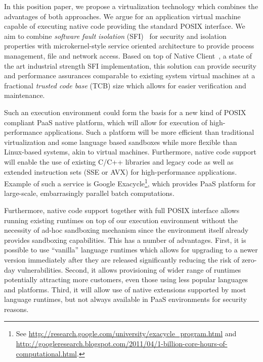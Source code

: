 In this position paper, we propose a virtualization technology which
combines the advantages of both approaches. We argue for an application
virtual machine capable of executing native code providing the standard
POSIX interface. We aim to combine \emph{software fault isolation}
(SFI)~\cite{wahbe:sosp93} for security and isolation properties with
microkernel-style service oriented architecture to provide process
management, file and network access. Based on top of Native
Client~\cite{yee:ieee-sp09}, a state of the art industrial strength SFI
implementation, this solution can provide security and performance
assurances comparable to existing system virtual machines at a
fractional \emph{trusted code base} (TCB) size which allows for easier
verification and maintenance. 

Such an execution environment could form the basis for a new kind of
POSIX compliant PaaS native platform, which will allow for execution of
high-performance applications. Such a platform will be more efficient
than traditional virtualization and some language based sandboxes while
more flexible than Linux-based systems, akin to virtual machines.
Furthermore, native code support will enable the use of existing C/C++
libraries and legacy code as well as extended instruction sets (\eg SSE
or AVX) for high-performance applications. Example of such a service is
Google Exacycle\footnote{See
\url{http://research.google.com/university/exacycle_program.html} and
\url{http://googleresearch.blogspot.com/2011/04/1-billion-core-hours-of-computational.html}.},
which provides PaaS platform for large-scale, embarrasingly parallel
batch computations.

Furthermore, native code support together with full POSIX interface
allows running existing runtimes on top of our execution environment
without the necessity of ad-hoc sandboxing mechanism since the
environment itself already provides sandboxing capabilities. This has a
number of advantages.  First, it is possible to use ``vanilla'' language
runtimes which allows for upgrading to a newer version immediately after
they are released significantly reducing the risk of zero-day
vulnerabilities. Second, it allows provisioning of wider range of
runtimes potentially attracting more customers, even those using less
popular languages and platforms.  Third, it will allow use of native
extensions supported by most language runtimes, but not always available in
PaaS environments for security reasons.


